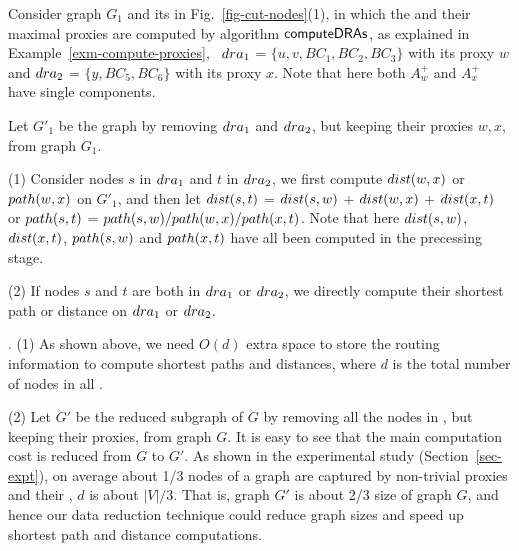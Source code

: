 \begin{example}
\label{exm-query}
Consider graph $G_1$ and its \bccs in Fig.~\ref{fig-cut-nodes}(1), in which the \dras and their maximal proxies are computed by algorithm ${\mathsf{computeDRAs}}$, as explained in Example~\ref{exm-compute-proxies}, \ie\ ${\sc dra}_1$ = $\{u, v, BC_1, BC_2, BC_3\}$ with its proxy $w$ and ${\sc dra}_2$ = $\{y, BC_5, BC_6\}$ with its proxy $x$.
Note that here both $A^{+}_w$ and $A^{+}_x$ have single components.  

Let $G'_1$ be the graph by removing ${\sc dra}_1$  and ${\sc dra}_2$, but keeping their proxies $w, x$, from graph $G_1$.

\sstab(1) Consider nodes $s$ in ${\sc dra}_1$  and $t$ in ${\sc dra}_2$, we first compute $\dist(w, x)$ or $\path(w,x)$ on $G'_1$, and then 
let $\dist(s, t)$ = $\dist(s, w)$ + $\dist(w, x)$ + $\dist(x, t)$ or $\path(s, t)$ = $\path(s, w)/\path(w, x)/\path(x, t)$.
Note that here $\dist(s, w)$, $\dist(x, t)$, $\path(s, w)$ and $\path(x, t)$ have all been computed in the precessing stage.


\sstab(2) If nodes $s$ and $t$ are both in ${\sc dra}_1$  or ${\sc dra}_2$, we directly compute their shortest path or distance on  ${\sc dra}_1$  or ${\sc dra}_2$.
\end{example}


.
(1) As shown above, we need $O(d)$ extra space to store the routing information to compute shortest paths and distances, where $d$ is the total number of nodes in all \dras.

\sstab (2) Let $G'$ be the reduced subgraph of $G$ by removing all the nodes in \dras, but keeping their proxies, from graph $G$. It is easy to see that the main computation cost is reduced from $G$ to $G'$. As shown in the experimental study (Section~\ref{sec-expt}), on average about 1/3 nodes of a graph are captured by non-trivial proxies and their \dras, \ie $d$ is about $|V|/3$. That is, graph $G'$ is about 2/3 size of graph $G$, and hence our data reduction technique could reduce graph sizes and speed up shortest path and distance computations. 
